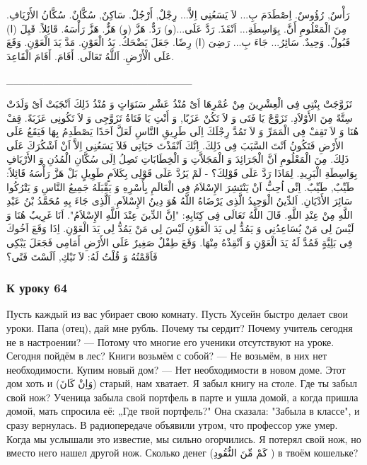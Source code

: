 \documentclass[a5paper]{article}
\begin{document}
رَأْسٌ, رُؤُوسٌ. اِصْطَدَمَ بِ... لاَ يَسَعُنِى اِلاَّ... رِجْلٌ, أَرْجُلٌ. سَاكِنٌ, سُكَّانٌ. سُكَّانُ الأَرْيَافِ. مِنَ الْمَعْلُومِ أَنَّ. بِوَاسِطَةِ... اَنْقَذَ. رَدَّ عَلَى...(و) رَدٌّ. هَزَّ (و) هَزٌّ. هَزَّ رَأْسَهُ. قَائِلاً. قَبِلَ (ا) قَبُولٌ. وَحِيدٌ. سَائِرُ... جَاءَ بِ... رَضِىَ (ا) رِضًا. جَعَلَ يَضْحَكُ. يَدُ الْعَوْنِ. مَدَّ يَدَ الْعَوْنِ. وَقَعَ عَلَى الْأَرْضِ. اَللَّهُ تَعَالَى. أَقَامَ. أَقَامَ الْقَاعِدَ.

\_\_\_\_\_\_\_\_\_\_\_\_\_\_\_\_\_\_\_\_\_\_\_\_\_

تَزَوَّجَتْ بِنْتِى فِى الْعِشْرِينَ مِنْ عُمْرِهَا اَىْ مُنْذُ عَشْرِ سَنَوَاتٍ وَ مُنْذُ ذَلِكَ اَنْجَبَتْ اَىْ وَلَدَتْ سِتَّةً مِنَ الأَوْلاَدِ. تَزَوَّجْ يَا فَتَى وَ لاَ تَكُنْ عَزَبًا, وَ أَنْتِ يَا فَتَاةُ تَزَوَّجِى وَ لاَ تَكُونِى عَزَبَةً. قِفْ هُنَا وَ لاَ تَقِفْ فِى الْمَمَرِّ وَ لاَ تَمُدَّ رِجْلَكَ اِلَى طَرِيقِ النَّاسِ لَعَلَّ اَحَدًا يَصْطَدِمُ بِهَا فَيَقَعُ عَلَى الأَرْضِ فَتَكُونُ اَنْتَ السَّبَبَ فِى ذَلِكَ. اِنَّكَ اَنْقَذْتَ حَيَاتِى فَلاَ يَسَعُنِى اِلاَّ اَنْ اَشْكُرَكَ عَلَى ذَلِكَ. مِنَ الْمَعْلُومِ اَنَّ الْجَرَائِدَ وَ الْمَجَلاَّتِ وَ الْخِطَابَاتِ تَصِلُ اِلَى سُكَّانِ الْمُدُنِ وَ الأَرْيَافِ بِوَاسِطَةِ الْبَرِيدِ. لِمَاذَا رَدَّ عَلَى قَوْلِكَ؟ - لَمْ يَرُدَّ عَلَى قَوْلِى بِكَلاَمٍ طَوِيلٍ بَلْ هَزَّ رَأْسَهُ قَائِلاً: طَيِّبٌ, طَيِّبٌ. اِنِّى اُحِبُّ اَنْ يَنْتَشِرَ الإِسْلاَمُ فِى الْعَالَمِ بِأَسْرِهِ وَ يَقْبَلَهُ جَمِيعُ النَّاسِ وَ يَتْرُكُوا سَائِرَ الأَدْيَانِ. اَلدِّينُ الْوَحِيدُ الَّذِى يَرْضَاهُ اللَّهُ هُوَ دِينُ الإِسْلاَمِ. اَلَّذِى جَاءَ بِهِ مُحَمَّدُ بْنُ عَبْدِ اللَّهِ مِنْ عِنْدِ اللَّهِ. قَالَ اللَّهُ تَعَالَى فِى كِتَابِهِ: "اِنَّ الدِّينَ عِنْدَ اللَّهِ الإِسْلاَمُ". اَنَا غَرِيبٌ هُنَا وَ لَيْسَ لِى مَنْ يُسَاعِدُنِى وَ يَمُدُّ لِى يَدَ الْعَوْنِ لَيْسَ لِى مَنْ يَمُدُّ لِى يَدَ الْعَوْنِ. اِذَا وَقَعَ اَخُوكَ فِى بَلِيَّةٍ فَمُدَّ لَهُ يَدَ الْعَوْنِ وَ اَنْقِذْهُ مِنْهَا. وَقَعَ طِفْلٌ صَغِيرٌ عَلَى الأَرْضِ أَمَامِى فَجَعَلَ يَبْكِى فَاَقَمْتُهُ وَ قُلْتُ لَهُ: لاَ تَبْكِ, اَلَسْتَ فَتًى؟ \ \ \ \ 

\subsubsection{К уроку 64}
Пусть каждый из вас убирает свою комнату. Пусть Хусейн быстро делает свои уроки. Папа (отец), дай мне рубль. Почему ты сердит? Почему учитель сегодня не в настроении? — Потому что многие его ученики отсутствуют на уроке. Сегодня пойдём в лес? Книги возьмём с собой? — Не возьмём, в них нет необходимости. Купим новый дом? — Нет необходимости в новом доме. Этот дом хоть и (وَاِنْ كَانَ) старый, нам хватает. Я забыл книгу на столе. Где ты забыл свой нож? Ученица забыла свой портфель в парте и ушла домой, а когда пришла домой, мать спросила её: „Где твой портфель?" Она сказала: "Забыла в классе", и сразу вернулась. В радиопередаче объявили утром, что профессор уже умер. Когда мы услышали это известие, мы сильно огорчились. Я потерял свой нож, но вместо него нашел другой нож. Сколько денег (كَمْ مِّنَ النُّقُودِ ) в твоём кошельке?
\end{document}
